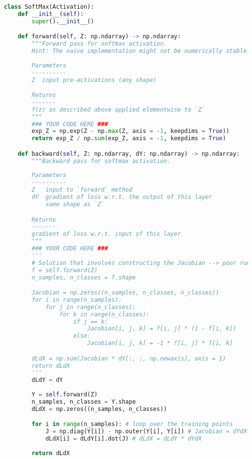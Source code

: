 \begin{lstlisting}[language=Python]
class SoftMax(Activation):
    def __init__(self):
        super().__init__()

    def forward(self, Z: np.ndarray) -> np.ndarray:
        """Forward pass for softmax activation.
        Hint: The naive implementation might not be numerically stable.
        
        Parameters
        ----------
        Z  input pre-activations (any shape)

        Returns
        -------
        f(z) as described above applied elementwise to `Z`
        """
        ### YOUR CODE HERE ###
        exp_Z = np.exp(Z - np.max(Z, axis = -1, keepdims = True))
        return exp_Z / np.sum(exp_Z, axis = -1, keepdims = True)

    def backward(self, Z: np.ndarray, dY: np.ndarray) -> np.ndarray:
        """Backward pass for softmax activation.
        
        Parameters
        ----------
        Z   input to `forward` method
        dY  gradient of loss w.r.t. the output of this layer
            same shape as `Z`

        Returns
        -------
        gradient of loss w.r.t. input of this layer
        """
        ### YOUR CODE HERE ###
        '''
        # Solution that involves constructing the Jacobian --> poor runtime
        f = self.forward(Z)
        n_samples, n_classes = f.shape

        Jacobian = np.zeros((n_samples, n_classes, n_classes))
        for i in range(n_samples):
            for j in range(n_classes):
                for k in range(n_classes):
                    if j == k:
                        Jacobian[i, j, k] = f[i, j] * (1 - f[i, k])
                    else:
                        Jacobian[i, j, k] = -1 * f[i, j] * f[i, k]

        dLdX = np.sum(Jacobian * dY[:, :, np.newaxis], axis = 1)
        return dLdX
        '''
        dLdY = dY
    
        Y = self.forward(Z)
        n_samples, n_classes = Y.shape
        dLdX = np.zeros((n_samples, n_classes))

        for i in range(n_samples): # loop over the training points
            J = np.diag(Y[i]) - np.outer(Y[i], Y[i]) # Jacobian = dYdX
            dLdX[i] = dLdY[i].dot(J) # dLdX = dLdY * dYdX
        
        return dLdX

\end{lstlisting}



